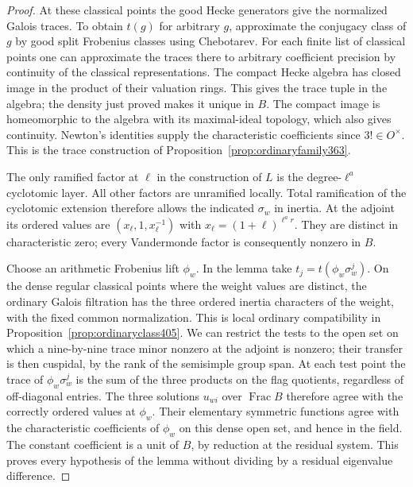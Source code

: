 \documentclass[a4paper,11pt]{article}
\theoremstyle{definition}
\theoremstyle{remark}
\numberwithin{equation}{section}
\begin{document}
\begin{proof}
At these classical points the good Hecke generators give
the normalized Galois traces. To obtain \(t(g)\) for arbitrary
\(g\), approximate the conjugacy class of \(g\) by good split
Frobenius classes using Chebotarev. For each finite list of
classical points one can approximate the traces there to
arbitrary coefficient precision by continuity of the
classical representations. The compact Hecke algebra has
closed image in the product of their valuation rings.
This gives the trace tuple in the algebra; the density just
proved makes it unique in \(B\). The compact image is
homeomorphic to the algebra with its maximal-ideal topology,
which also gives continuity. Newton's identities supply the
characteristic coefficients since \(3!\in O^\times\).
This is the trace construction of
Proposition~\ref{prop:ordinaryfamily363}.

The only ramified factor at \(\ell\) in the construction of
\(L\) is the degree-\(\ell^a\) cyclotomic layer. All other
factors are unramified locally. Total ramification of the
cyclotomic extension therefore allows the indicated
\(\sigma_w\) in inertia. At the adjoint its ordered values
are \((x_\ell,1,x_\ell^{-1})\) with
\(x_\ell=(1+\ell)^{\ell^a r}\). They are distinct in
characteristic zero; every Vandermonde factor is consequently
nonzero in \(B\).

Choose an arithmetic Frobenius lift \(\phi_w\). In the lemma
take \(t_j=t(\phi_w\sigma_w^j)\). On the dense regular classical
points where the weight values are distinct, the ordinary
Galois filtration has the three ordered inertia characters
of the weight, with the fixed common normalization. This is
local ordinary compatibility in
Proposition~\ref{prop:ordinaryclass405}. We can restrict the
tests to the open set on which a nine-by-nine trace minor
nonzero at the adjoint is nonzero; their transfer is then
cuspidal, by the rank of the semisimple group span. At each
test point the trace of \(\phi_w\sigma_w^j\) is the sum of
the three products on the flag quotients, regardless of
off-diagonal entries. The three solutions \(u_{wi}\) over
\(\operatorname{Frac}B\) therefore agree with the correctly
ordered values at \(\phi_w\). Their elementary symmetric
functions agree with the characteristic coefficients of
\(\phi_w\) on this dense open set, and hence in the field.
The constant coefficient is a unit of \(B\), by reduction
at the residual system. This proves every hypothesis of the
lemma without dividing by a residual eigenvalue difference.


\end{proof}
\end{document}
